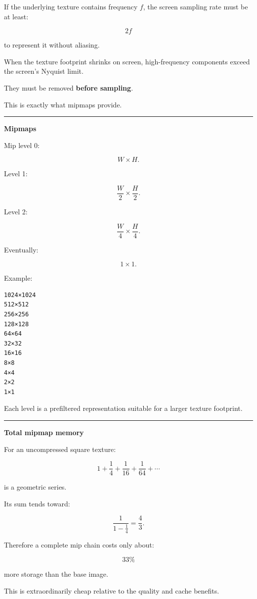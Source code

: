 If the underlying texture contains frequency \(f\), the screen sampling rate must be at least:

\[
2f
\]

to represent it without aliasing.

When the texture footprint shrinks on screen, high-frequency components exceed the screen's Nyquist limit.

They must be removed \textbf{before sampling}.

This is exactly what mipmaps provide.

\begin{center}\rule{0.5\linewidth}{0.5pt}\end{center}

\textbf{Mipmaps}

Mip level 0:

\[
W\times H.
\]

Level 1:

\[
\frac W2\times\frac H2.
\]

Level 2:

\[
\frac W4\times\frac H4.
\]

Eventually:

\[
1\times1.
\]

Example:

\begin{verbatim}
1024×1024
512×512
256×256
128×128
64×64
32×32
16×16
8×8
4×4
2×2
1×1
\end{verbatim}

Each level is a prefiltered representation suitable for a larger texture footprint.

\begin{center}\rule{0.5\linewidth}{0.5pt}\end{center}

\textbf{Total mipmap memory}

For an uncompressed square texture:

\[
1+\frac14+\frac1{16}+\frac1{64}+\cdots
\]

is a geometric series.

Its sum tends toward:

\[
\frac{1}{1-\frac14}
=
\frac43.
\]

Therefore a complete mip chain costs only about:

\[
\boxed{33\%}
\]

more storage than the base image.

This is extraordinarily cheap relative to the quality and cache benefits.


